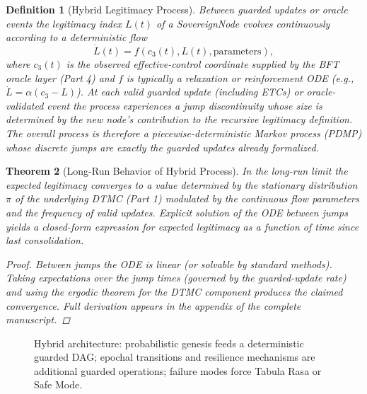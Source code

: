 \documentclass[11pt,a4paper]{article}
\newtheorem{theorem}{Theorem}[section]
\newtheorem{definition}[theorem]{Definition}
\begin{document}
\begin{definition}[Hybrid Legitimacy Process]
Between guarded updates or oracle events the legitimacy index \(L(t)\) of a SovereignNode evolves continuously according to a deterministic flow
\[
\dot{L}(t) = f(c_3(t), L(t), \text{parameters}),
\]
where \(c_3(t)\) is the observed effective-control coordinate supplied by the BFT oracle layer (Part 4) and \(f\) is typically a relaxation or reinforcement ODE (e.g., \(\dot{L} = \alpha(c_3 - L)\)). At each valid guarded update (including ETCs) or oracle-validated event the process experiences a jump discontinuity whose size is determined by the new node's contribution to the recursive legitimacy definition. The overall process is therefore a piecewise-deterministic Markov process (PDMP) whose discrete jumps are exactly the guarded updates already formalized.
\end{definition}

\begin{theorem}[Long-Run Behavior of Hybrid Process]
In the long-run limit the expected legitimacy converges to a value determined by the stationary distribution \(\pi\) of the underlying DTMC (Part 1) modulated by the continuous flow parameters and the frequency of valid updates. Explicit solution of the ODE between jumps yields a closed-form expression for expected legitimacy as a function of time since last consolidation.

\begin{proof}
Between jumps the ODE is linear (or solvable by standard methods). Taking expectations over the jump times (governed by the guarded-update rate) and using the ergodic theorem for the DTMC component produces the claimed convergence. Full derivation appears in the appendix of the complete manuscript.
\end{proof}
\end{theorem}

\begin{figure}[h]
\centering
{}
\caption{Hybrid architecture: probabilistic genesis feeds a deterministic guarded DAG; epochal transitions and resilience mechanisms are additional guarded operations; failure modes force Tabula Rasa or Safe Mode.}
\end{figure}
\end{document}
